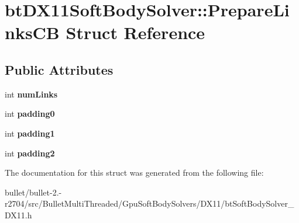 \hypertarget{structbt_d_x11_soft_body_solver_1_1_prepare_links_c_b}{\section{bt\+D\+X11\+Soft\+Body\+Solver\+:\+:Prepare\+Links\+C\+B Struct Reference}
\label{structbt_d_x11_soft_body_solver_1_1_prepare_links_c_b}
}
\subsection*{Public Attributes}
\begin{DoxyCompactItemize}
\item 
\hypertarget{structbt_d_x11_soft_body_solver_1_1_prepare_links_c_b_af79f89e1994a9fe4473e39f2e8aee8dd}{int {\bfseries num\+Links}}\label{structbt_d_x11_soft_body_solver_1_1_prepare_links_c_b_af79f89e1994a9fe4473e39f2e8aee8dd}

\item 
\hypertarget{structbt_d_x11_soft_body_solver_1_1_prepare_links_c_b_aa4b6a7136d7cafb63f6ffc7b4ebbe65b}{int {\bfseries padding0}}\label{structbt_d_x11_soft_body_solver_1_1_prepare_links_c_b_aa4b6a7136d7cafb63f6ffc7b4ebbe65b}

\item 
\hypertarget{structbt_d_x11_soft_body_solver_1_1_prepare_links_c_b_a9c6f7e3c1280edd206b751d3b5189e5c}{int {\bfseries padding1}}\label{structbt_d_x11_soft_body_solver_1_1_prepare_links_c_b_a9c6f7e3c1280edd206b751d3b5189e5c}

\item 
\hypertarget{structbt_d_x11_soft_body_solver_1_1_prepare_links_c_b_a460d516c30cb8e7ad9165dc6652bebc3}{int {\bfseries padding2}}\label{structbt_d_x11_soft_body_solver_1_1_prepare_links_c_b_a460d516c30cb8e7ad9165dc6652bebc3}

\end{DoxyCompactItemize}


The documentation for this struct was generated from the following file\+:\begin{DoxyCompactItemize}
\item 
bullet/bullet-\/2.-\/r2704/src/\+Bullet\+Multi\+Threaded/\+Gpu\+Soft\+Body\+Solvers/\+D\+X11/bt\+Soft\+Body\+Solver\+\_\+\+D\+X11.\+h\end{DoxyCompactItemize}
